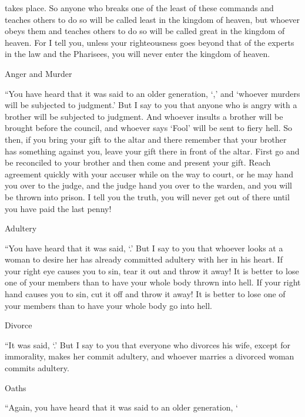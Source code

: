 {takes place.
So
anyone
who breaks
one
of the
least
of these
commands
and
teaches
others
to do so
will be called
least
in
the
kingdom
of heaven,
but
whoever
obeys
them and
teaches
others to do so will be called
great
in
the
kingdom
of heaven.
For
I tell
you,
unless
your
righteousness
goes
beyond
that of the experts in the law
and
the Pharisees,
you will
never
enter
the
kingdom
of heaven.
\par }{\SH Anger and Murder
\par }{\PP {}“You have heard
that
it was said
to an older
generation, ‘{},’ and
‘whoever
murders
will be
subjected
to judgment.’
But
I
say
to you
that
anyone
who is angry
with a brother
will be
subjected
to judgment.
And
whoever
insults
a brother
will be
brought
before the
council,
and
whoever
says
‘Fool’
will be
sent
to
fiery
hell.
So then,
if
you bring
your
gift
to
the altar
and there
remember
that
your
brother
has
something
against
you,
leave
your
gift
there
in front
of the altar.
First
go
and
be reconciled
to your
brother
and
then
come
and present
your
gift.
Reach agreement
quickly
with your
accuser
while
on
the
way
to court, or he may hand
you
over
to the
judge,
and
the
judge
hand you over to the warden,
and
you will be thrown
into
prison.
I tell
you
the truth,
you will
never
get out
of there
until
you have paid
the last
penny!
\par }{\SH Adultery
\par }{\PP {}“You have heard
that
it was said, ‘{}.’
But
I
say
to you
that
whoever
looks at
a woman
to
desire
her
has
already
committed adultery
with her
in
his
heart.
If
your
right
eye
causes
you
to sin,
tear
it
out
and
throw
it away! It is better
to
lose
one
of your
members
than
to have your
whole
body
thrown
into
hell.
If
your
right
hand
causes
you
to sin,
cut
it
off
and
throw
it away! It is better
to
lose
one
of your
members
than
to have your
whole
body
go
into
hell.
\par }{\SH Divorce
\par }{\PP {}“It was said, ‘{}.’
But
I
say
to you
that
everyone
who divorces
his
wife,
except
for immorality,
makes
her
commit adultery,
and
whoever
marries
a divorced woman
commits adultery.
\par }{\SH Oaths
\par }{\PP {}“Again,
you have heard
that
it was said
to an older generation, ‘{\BD{
{\QT{
}}}}}
